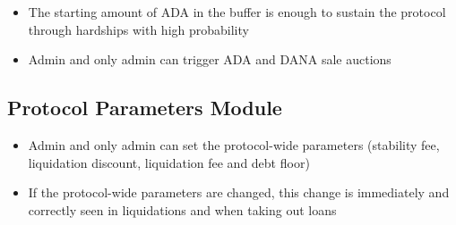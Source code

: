 \documentclass{article} %
\begin{document}
\begin{itemize}
  \item The starting amount of ADA in the buffer is enough to sustain the protocol through hardships with high probability
  \item Admin and only admin can trigger ADA and DANA sale auctions
\end{itemize}

\subsection{Protocol Parameters Module}
\begin{itemize}
  \item Admin and only admin can set the protocol-wide parameters (stability
    fee, liquidation discount, liquidation fee and debt
    floor)
  \item If the protocol-wide parameters are changed, this change is immediately
    and correctly seen in liquidations and when taking out loans
\end{itemize}  

% 
\end{document}
